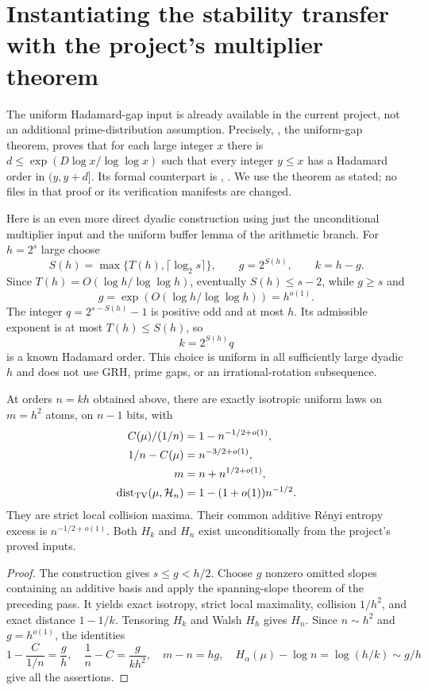 \section{Instantiating the stability transfer with the project's multiplier theorem}
\label{s28:sec:stability-project-input}

The uniform Hadamard-gap input is already available in the current
project, not an additional prime-distribution assumption. Precisely,
, the uniform-gap
theorem, proves that for each large integer $x$ there is
$d\le\exp(D\log x/\log\log x)$ such that every integer $y\le x$ has a
Hadamard order in $(y,y+d]$. Its formal counterpart is
,
. We use the theorem as stated;
no files in that proof or its verification manifests are changed.

Here is an even more direct dyadic construction using just the
unconditional multiplier input and the uniform buffer lemma of the
arithmetic branch. For $h=2^s$ large choose
\[
 S(h)=\max\{T(h),\lceil\log_2s\rceil\},\qquad
 g=2^{S(h)},\qquad k=h-g.
\]
Since $T(h)=O(\log h/\log\log h)$, eventually
$S(h)\le s-2$, while $g\ge s$ and
\[
                 g=\exp(O(\log h/\log\log h))=h^{o(1)}.
\]
The integer $q=2^{s-S(h)}-1$ is positive odd and at most $h$.
Its admissible exponent is at most $T(h)\le S(h)$, so
\[
                    k=2^{S(h)}q
\]
is a known Hadamard order. This choice is uniform in all sufficiently
large dyadic $h$ and does not use GRH, prime gaps, or an
irrational-rotation subsequence.

\begin{corollary}
\label{s28:cor:stability-project-rate}
At orders $n=kh$ obtained above, there are exactly isotropic uniform
laws on $m=h^2$ atoms, on $n-1$ bits, with
\[
 \begin{split}
 C(\mu)/(1/n)&=1-n^{-1/2+o(1)},\\
 1/n-C(\mu)&=n^{-3/2+o(1)},\\
 m&=n+n^{1/2+o(1)},\\
 \operatorname{dist}_{\rm TV}(\mu,\mathcal H_n)
       &=1-(1+o(1))n^{-1/2}.
 \end{split}
\]
They are strict local collision maxima. Their common additive
R\'enyi entropy excess is $n^{-1/2+o(1)}$.
Both $H_k$ and $H_n$ exist unconditionally from the project's
proved inputs.
\end{corollary}
\begin{proof}
The construction gives $s\le g<h/2$. Choose $g$ nonzero omitted
slopes containing an additive basis and apply the spanning-slope
theorem of the preceding pass. It yields exact isotropy, strict
local maximality, collision $1/h^2$, and exact distance $1-1/k$.
Tensoring $H_k$ and Walsh $H_h$ gives $H_n$.
Since $n\sim h^2$ and $g=h^{o(1)}$, the identities
\[
 1-\frac{C}{1/n}=\frac gh,\quad
 \frac1n-C=\frac{g}{kh^2},\quad
 m-n=hg,\quad
 H_\alpha(\mu)-\log n=\log(h/k)\sim g/h
\]
give all the assertions.
\end{proof}

